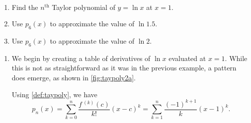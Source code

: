 \begin{example}\label{ex_taypoly2}
\mbox{}\\[-2\baselineskip]\begin{enumerate}
	\item	Find the $n^\text{th}$ Taylor polynomial of $y=\ln x$ at $x=1$.
	\item	Use $p_6(x)$ to approximate the value of $\ln 1.5$.
	\item	Use $p_6(x)$ to approximate the value of $\ln 2$. 
\end{enumerate}
\solution
\begin{enumerate}
\item	We begin by creating a table of derivatives of $\ln x$ evaluated at $x=1$. While this is not as straightforward as it was in the previous example, a pattern does emerge, as shown in \autoref{fig:taypoly2a}.

Using \autoref{def:taypoly}, we have
\[
	p_n(x)
	= \sum_{k=0}^n\frac{f\,^{(k)}(c)}{k!}(x-c)^k
	= \sum_{k=1}^n\frac{(-1)^{k+1}}k(x-1)^k.
\]


\end{enumerate}
\end{example}

